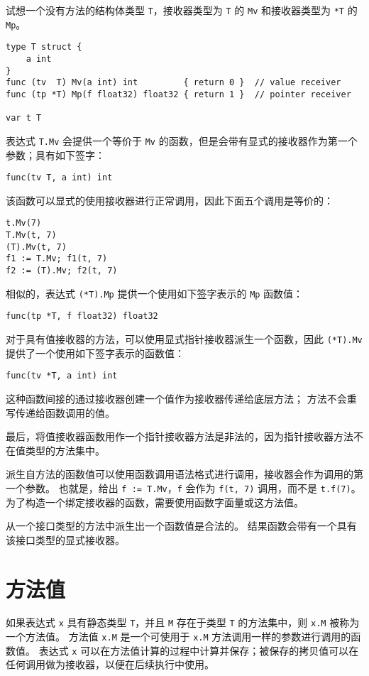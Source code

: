 试想一个没有方法的结构体类型 \lstinline|T|，接收器类型为 \lstinline|T| 的 \lstinline|Mv| 和接收器类型为 \lstinline|*T| 的 \lstinline|Mp|。
\begin{lstlisting}[style=golang]
type T struct {
	a int
}
func (tv  T) Mv(a int) int         { return 0 }  // value receiver
func (tp *T) Mp(f float32) float32 { return 1 }  // pointer receiver

var t T
\end{lstlisting}
表达式 \lstinline|T.Mv| 会提供一个等价于 \lstinline|Mv| 的函数，但是会带有显式的接收器作为第一个参数；具有如下签字：
\begin{lstlisting}[style=golang]
func(tv T, a int) int
\end{lstlisting}
该函数可以显式的使用接收器进行正常调用，因此下面五个调用是等价的：
\begin{lstlisting}[style=golang]
t.Mv(7)
T.Mv(t, 7)
(T).Mv(t, 7)
f1 := T.Mv; f1(t, 7)
f2 := (T).Mv; f2(t, 7)
\end{lstlisting}
相似的，表达式 \lstinline|(*T).Mp| 提供一个使用如下签字表示的 \lstinline|Mp| 函数值：
\begin{lstlisting}[style=golang]
func(tp *T, f float32) float32
\end{lstlisting}

对于具有值接收器的方法，可以使用显式指针接收器派生一个函数，因此 \lstinline|(*T).Mv| 提供了一个使用如下签字表示的函数值：
\begin{lstlisting}[style=golang]
func(tv *T, a int) int
\end{lstlisting}
这种函数间接的通过接收器创建一个值作为接收器传递给底层方法；
方法不会重写传递给函数调用的值。

最后，将值接收器函数用作一个指针接收器方法是非法的，因为指针接收器方法不在值类型的方法集中。

派生自方法的函数值可以使用函数调用语法格式进行调用，接收器会作为调用的第一个参数。
也就是，给出 \lstinline|f := T.Mv|，\lstinline|f| 会作为 \lstinline|f(t, 7)| 调用，而不是 \lstinline|t.f(7)|。
为了构造一个绑定接收器的函数，需要使用函数字面量或这方法值。

从一个接口类型的方法中派生出一个函数值是合法的。
结果函数会带有一个具有该接口类型的显式接收器。

\section{方法值}
如果表达式 \lstinline|x| 具有静态类型 \lstinline|T|，并且 \lstinline|M| 存在于类型 \lstinline|T| 的方法集中，则 \lstinline|x.M| 被称为一个方法值。
方法值 \lstinline|x.M| 是一个可使用于 \lstinline|x.M| 方法调用一样的参数进行调用的函数值。
表达式 \lstinline|x| 可以在方法值计算的过程中计算并保存；被保存的拷贝值可以在任何调用做为接收器，以便在后续执行中使用。

